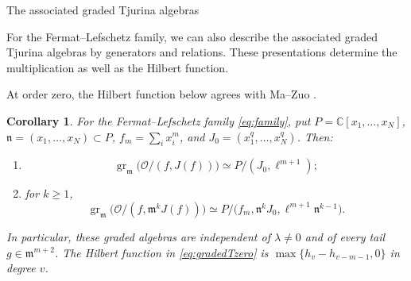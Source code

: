 \documentclass[12pt,reqno]{amsart}
\makeatletter
\renewcommand\subsection{\@startsection{subsection}{2}%
  \z@{.8\linespacing\@plus.3\linespacing}{.35\linespacing}%
  {\normalfont\bfseries}}
\newcommand{\C}{\mathbb C}
\newcommand{\mm}{\mathfrak m}
\newcommand{\gr}{\operatorname{gr}}
\newcommand{\OO}{\mathcal O}
\newtheorem{corollary}[theorem]{Corollary}
\theoremstyle{definition}
\makeatother
\begin{document}
\subsection{The associated graded Tjurina algebras}
\label{sec:graded}


For the Fermat--Lefschetz family, we can also describe
the associated graded Tjurina algebras by generators and relations.
These presentations determine the multiplication as well as the
Hilbert function.

At order zero, the Hilbert function below agrees with
Ma--Zuo \cite[proof of Theorem~5.3, Steps~II--III]{MaZuo}.


\begin{corollary}\label{cor:gradedattainers}
For the Fermat--Lefschetz family \eqref{eq:family}, put
$P=\C[x_1,\ldots,x_N]$, $\mathfrak n=(x_1,\ldots,x_N)\subset P$,
$f_m=\sum_i x_i^m$, and $J_0=(x_1^q,\ldots,x_N^q)$.
Then:
\begin{enumerate}
\item \begin{equation}\label{eq:gradedTzero}
 \gr_{\mm}\bigl(\OO/(f,J(f))\bigr)\simeq P/(J_0,\ell^{m+1});
\end{equation}
\item for $k\geq1$,
\begin{equation}\label{eq:gradedThigher}
 \gr_{\mm}\bigl(\OO/(f,\mm^kJ(f))\bigr)
   \simeq P/\bigl(f_m,\mathfrak n^kJ_0,
                         \ell^{m+1}\mathfrak n^{k-1}\bigr).
\end{equation}
\end{enumerate}
In particular, these graded algebras are independent of $\lambda\ne0$
and of every tail $g\in\mm^{m+2}$.
The Hilbert function in \eqref{eq:gradedTzero} is
$\max\{h_v-h_{v-m-1},0\}$ in degree $v$.
\end{corollary}
\end{document}
